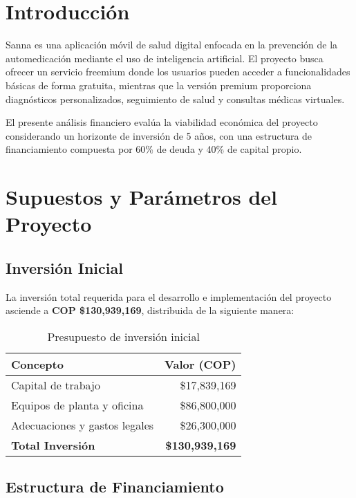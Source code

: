 \section{Introducción}

Sanna es una aplicación móvil de salud digital enfocada en la prevención de la automedicación mediante el uso de inteligencia artificial. El proyecto busca ofrecer un servicio freemium donde los usuarios pueden acceder a funcionalidades básicas de forma gratuita, mientras que la versión premium proporciona diagnósticos personalizados, seguimiento de salud y consultas médicas virtuales.

El presente análisis financiero evalúa la viabilidad económica del proyecto considerando un horizonte de inversión de 5 años, con una estructura de financiamiento compuesta por 60\% de deuda y 40\% de capital propio.

\section{Supuestos y Parámetros del Proyecto}

\subsection{Inversión Inicial}

La inversión total requerida para el desarrollo e implementación del proyecto asciende a \textbf{COP \$130,939,169}, distribuida de la siguiente manera:

\begin{table}[H]
\centering
\begin{tabular}{lr}
\toprule
\textbf{Concepto} & \textbf{Valor (COP)} \\
\midrule
Capital de trabajo & \$17,839,169 \\
Equipos de planta y oficina & \$86,800,000 \\
Adecuaciones y gastos legales & \$26,300,000 \\
\midrule
\textbf{Total Inversión} & \textbf{\$130,939,169} \\
\bottomrule
\end{tabular}
\caption{Presupuesto de inversión inicial}
\end{table}

\subsection{Estructura de Financiamiento}

